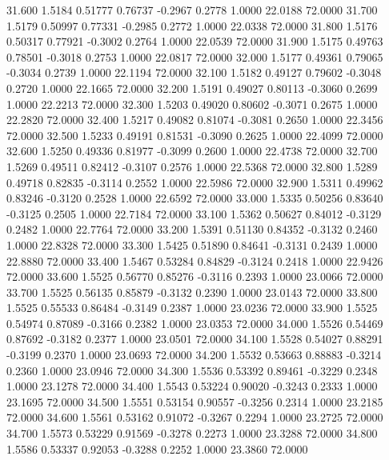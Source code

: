   31.600   1.5184   0.51777   0.76737  -0.2967   0.2778   1.0000  22.0188  72.0000
  31.700   1.5179   0.50997   0.77331  -0.2985   0.2772   1.0000  22.0338  72.0000
  31.800   1.5176   0.50317   0.77921  -0.3002   0.2764   1.0000  22.0539  72.0000
  31.900   1.5175   0.49763   0.78501  -0.3018   0.2753   1.0000  22.0817  72.0000
  32.000   1.5177   0.49361   0.79065  -0.3034   0.2739   1.0000  22.1194  72.0000
  32.100   1.5182   0.49127   0.79602  -0.3048   0.2720   1.0000  22.1665  72.0000
  32.200   1.5191   0.49027   0.80113  -0.3060   0.2699   1.0000  22.2213  72.0000
  32.300   1.5203   0.49020   0.80602  -0.3071   0.2675   1.0000  22.2820  72.0000
  32.400   1.5217   0.49082   0.81074  -0.3081   0.2650   1.0000  22.3456  72.0000
  32.500   1.5233   0.49191   0.81531  -0.3090   0.2625   1.0000  22.4099  72.0000
  32.600   1.5250   0.49336   0.81977  -0.3099   0.2600   1.0000  22.4738  72.0000
  32.700   1.5269   0.49511   0.82412  -0.3107   0.2576   1.0000  22.5368  72.0000
  32.800   1.5289   0.49718   0.82835  -0.3114   0.2552   1.0000  22.5986  72.0000
  32.900   1.5311   0.49962   0.83246  -0.3120   0.2528   1.0000  22.6592  72.0000
  33.000   1.5335   0.50256   0.83640  -0.3125   0.2505   1.0000  22.7184  72.0000
  33.100   1.5362   0.50627   0.84012  -0.3129   0.2482   1.0000  22.7764  72.0000
  33.200   1.5391   0.51130   0.84352  -0.3132   0.2460   1.0000  22.8328  72.0000
  33.300   1.5425   0.51890   0.84641  -0.3131   0.2439   1.0000  22.8880  72.0000
  33.400   1.5467   0.53284   0.84829  -0.3124   0.2418   1.0000  22.9426  72.0000
  33.600   1.5525   0.56770   0.85276  -0.3116   0.2393   1.0000  23.0066  72.0000
  33.700   1.5525   0.56135   0.85879  -0.3132   0.2390   1.0000  23.0143  72.0000
  33.800   1.5525   0.55533   0.86484  -0.3149   0.2387   1.0000  23.0236  72.0000
  33.900   1.5525   0.54974   0.87089  -0.3166   0.2382   1.0000  23.0353  72.0000
  34.000   1.5526   0.54469   0.87692  -0.3182   0.2377   1.0000  23.0501  72.0000
  34.100   1.5528   0.54027   0.88291  -0.3199   0.2370   1.0000  23.0693  72.0000
  34.200   1.5532   0.53663   0.88883  -0.3214   0.2360   1.0000  23.0946  72.0000
  34.300   1.5536   0.53392   0.89461  -0.3229   0.2348   1.0000  23.1278  72.0000
  34.400   1.5543   0.53224   0.90020  -0.3243   0.2333   1.0000  23.1695  72.0000
  34.500   1.5551   0.53154   0.90557  -0.3256   0.2314   1.0000  23.2185  72.0000
  34.600   1.5561   0.53162   0.91072  -0.3267   0.2294   1.0000  23.2725  72.0000
  34.700   1.5573   0.53229   0.91569  -0.3278   0.2273   1.0000  23.3288  72.0000
  34.800   1.5586   0.53337   0.92053  -0.3288   0.2252   1.0000  23.3860  72.0000
